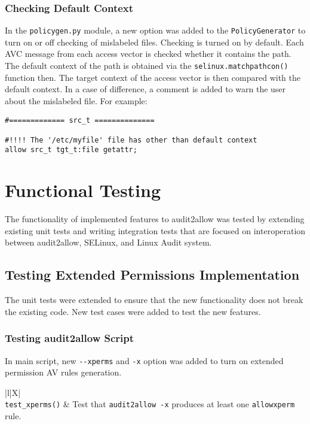\subsection{Checking Default Context}
In the \texttt{policygen.py} module, a new option was added to the
\texttt{PolicyGenerator} to turn on or off checking of mislabeled files.
Checking is turned on by default. Each AVC message from each access vector is
checked whether it contains the path. The default context of the path is
obtained via the \texttt{selinux.matchpathcon()} function then. The target
context of the access vector is then compared with the default context. In a
case of difference, a comment is added to warn the user about the mislabeled
file. For example:
\begin{lstlisting}
#============= src_t ==============

#!!!! The '/etc/myfile' file has other than default context
allow src_t tgt_t:file getattr;
\end{lstlisting}

\chapter{Functional Testing}
The functionality of implemented features to audit2allow was tested by extending
existing unit tests and writing integration tests that are focused on
interoperation between audit2allow, SELinux, and Linux Audit system.

\section{Testing Extended Permissions Implementation}
The unit tests were extended to ensure that the new functionality does not break
the existing code. New test cases were added to test the new features.

\subsection{Testing audit2allow Script}
In main script, new \texttt{-{}-xperms} and \texttt{-x} option was added to turn
on extended permission AV rules generation.
\tabulinesep=5pt

\begin{longtabu}{|l|X|} \hline
    \\ \hline
    \texttt{test\_xperms()} & Test that \texttt{audit2allow -x}
    produces at least one \texttt{allowxperm} rule. \\ \hline
\end{longtabu}

